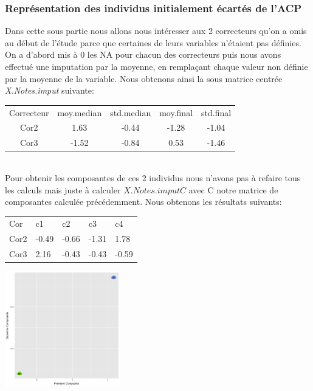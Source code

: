 \documentclass[10pt]{article}
\begin{document}
\subsubsection{Représentation des individus initialement écartés de l’ACP}
Dans cette sous partie nous allons nous intéresser aux 2 correcteurs qu'on a omis au début de l'étude parce que certaines de leurs variables n'étaient pas définies. On a d'abord mis à 0 les NA pour chacun des correcteurs puis nous avons effectué une imputation par la moyenne, en remplaçant chaque valeur non définie par la moyenne de la variable. Nous obtenons ainsi la sous matrice centrée \textit{X.Notes.imput} suivante:\\

\begin{tabular}{c c c c c}
	Correcteur & moy.median &	std.median	& moy.final	&std.final\\
	Cor2 & 1.63 &	-0.44 &	-1.28 &	-1.04\\
	Cor3 & -1.52 &	-0.84 &	0.53 &	-1.46
\end{tabular}
\vspace{0.9mm}
\\Pour obtenir les composantes de ces 2 individus nous n'avons pas à refaire tous les calculs mais juste à calculer $X.Notes.imput C$ avec C notre matrice de composantes calculée précédemment. Nous obtenons les résultats suivants:\\

\begin{minipage}[t]{0.5\textwidth}
\begin{tabular}{l l l l l}
	Cor &  c1         &             c2 &          c3               &  c4\\
	Cor2 & -0.49 &	-0.66&	-1.31 &	1.78\\
	Cor3 & 2.16	& -0.43  &	-0.43& 	-0.59
\end{tabular}
\end{minipage}
\begin{minipage}[t]{0.5\textwidth}
		\includegraphics[width=50mm]{Figures/Notes_PCA/individus_comp_na.png}
	\label{fig:individus_comp_na}	
\end{minipage}
\end{document}
